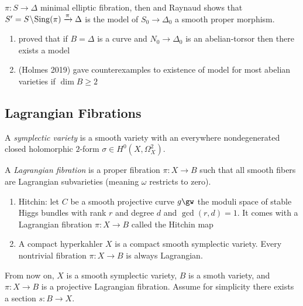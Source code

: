 \documentclass[12pt]{article}
\begin{document}
\begin{example}
$\pi : S \to \Delta$ minimal elliptic fibration, then \Neron and Raynaud shows that $S' = S \! \setminus \! \mathrm{Sing}(\pi) \xrightarrow{\pi} \Delta$ is the \Neron model of $S_0 \to \Delta_0$ a smooth proper morphism. 
\end{example}

\begin{rmk}
\begin{enumerate}
\item \Neron proved that if $B = \Delta$ is a curve and $N_0 \to \Delta_0$ is an abelian-torsor then there exists a \Neron model
\item (Holmes 2019) gave counterexamples to existence of \Neron model for most abelian varieties if $\dim{B} \ge 2$
\end{enumerate}
\end{rmk}

\subsection{Lagrangian Fibrations}

\begin{defn}
A \textit{symplectic variety} is a smooth variety with an everywhere nondegenerated closed holomorphic $2$-form $\sigma \in H^0(X, \Omega_X^2)$.
\end{defn}

\begin{defn}
A \textit{Lagrangian fibration} is a proper fibration $\pi : X \to B$ such that all smooth fibers are Lagrangian subvarieties (meaning $\omega$ restricts to zero).
\end{defn}

\begin{example}
\begin{enumerate}
\item Hitchin: let $C$ be a smooth projective curve $g \gw$ the moduli space of stable Higgs bundles with rank $r$ and degree $d$ and $\gcd(r,d) = 1$. It comes with a Lagrangian fibration $\pi : X \to B$ called the Hitchin map
\item A compact hyperkahler $X$ is a compact smooth symplectic variety. Every nontrivial fibration $\pi : X \to B$ is always Lagrangian.
\end{enumerate}
\end{example}

From now on, $X$ is a smooth symplectic variety, $B$ is a smoth variety, and $\pi : X \to B$ is a projective Lagrangian fibration. Assume for simplicity there exists a section $s : B \to X$. 
\end{document}
